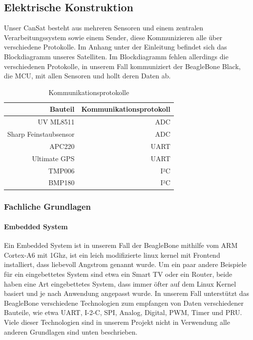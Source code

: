 \subsection{Elektrische Konstruktion}
Unser CanSat besteht aus mehreren Sensoren und einem zentralen Verarbeitungssystem sowie einem Sender, diese Kommunizieren alle über verschiedene Protokolle. Im Anhang unter der Einleitung befindet sich das Blockdiagramm unseres Satelliten. Im Blockdiagramm fehlen allerdings die verschiedenen Protokolle, in unserem Fall kommuniziert der BeagleBone Black, die MCU, mit allen Sensoren und hollt deren Daten ab.

\begin{table}[H]
  \centering
    \begin{tabular}{rr}
    \toprule
    \textbf{Bauteil} & \textbf{Kommunikationsprotokoll} \\
    \midrule 
    UV ML8511 & ADC \\
    Sharp Feinstaubsensor & ADC \\
    APC220 & UART \\
    Ultimate GPS & UART \\
    TMP006 & I²C \\
    BMP180 & I²C \\
    \bottomrule
    \end{tabular}
    \caption{Kommunikationsprotokolle}
\end{table}

\subsubsection{Fachliche Grundlagen}
\paragraph{Embedded System}
Ein Embedded System ist in unserem Fall der BeagleBone mithilfe vom ARM Cortex-A6 mit 1Ghz, ist ein leich modifizierte linux kernel mit Frontend installiert, dass liebevoll Angstrom genannt wurde. Um ein paar andere Beispiele für ein eingebettetes System sind etwa ein Smart TV oder ein Router, beide haben eine Art eingebettetes System, dass immer öfter auf dem Linux Kernel basiert und je nach Anwendung angepasst wurde. In unserem Fall unterstützt das BeagleBone verschiedene Technologien zum empfangen von Daten verschiedener Bauteile, wie etwa UART, I-2-C, SPI, Analog, Digital, PWM, Timer und PRU. Viele dieser Technologien sind in unserem Projekt nicht in Verwendung alle anderen Grundlagen sind unten beschrieben.

